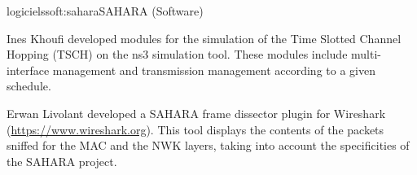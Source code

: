 \documentclass{ra2016}
\begin{document}
\begin{module}{logiciels}{soft:sahara}{SAHARA (Software)} 

\begin{participants}
\end{participants}

Ines Khoufi developed modules for the simulation of the Time Slotted Channel Hopping (TSCH) on the 
ns3 simulation tool. These modules include multi-interface management and transmission management according 
to a given schedule. 
 
Erwan Livolant developed a SAHARA frame dissector plugin for Wireshark (\url{https://www.wireshark.org}). This tool displays the contents of the packets sniffed for the MAC and the NWK layers, taking into account the specificities of the SAHARA project.

\end{module}
\end{document}
